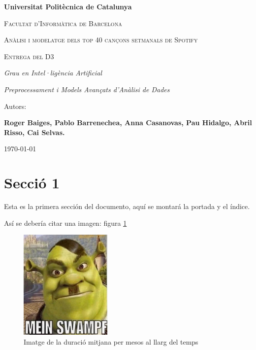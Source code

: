\documentclass{article}
\begin{document}
\begin{titlepage}
\thispagestyle{logos}
\vspace*{1.5cm}
\centering
{\bfseries\LARGE Universitat Politècnica de Catalunya \par}
\vspace{1cm}
{\scshape\Large Facultat d'Informàtica de Barcelona \par}
\vspace{2.5cm}
{\scshape\Huge Anàlisi i modelatge dels top 40 cançons setmanals de Spotify\par}
\vspace{0.5cm}
{\scshape\LARGE Entrega del D3 \par}
\vspace{2.5cm}
{\itshape\Large Grau en Intel·ligència Artificial \par}
{\itshape\Large Preprocessament i Models Avançats d'Anàlisi de Dades\par}
\vfill
{\Large Autors: \par}
{\Large \textbf{Roger Baiges, Pablo Barrenechea, Anna Casanovas, Pau Hidalgo, Abril Risso, Cai Selvas.}  \par}
\vfill
{\Large \today \par}
\end{titlepage}


\newpage
\tableofcontents


\newpage
\section{Secció 1}

Esta es la primera sección del documento, aquí se montará la portada y el índice.

Así se debería citar una imagen: figura \ref{fig:Section1_Imagen1}

\begin{figure}[H]
    \centering
    \includegraphics[width=0.4\textwidth]{Images/Section1/Imagen1.jpg}
    \caption{Imatge de la duració mitjana per mesos al llarg del temps}
    \label{fig:Section1_Imagen1}
\end{figure}
\end{document}
